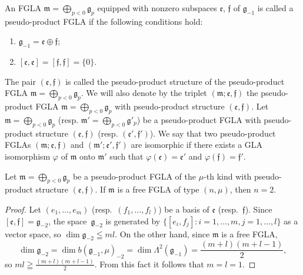 \documentclass[pdftex]{sigma}
\numberwithin{equation}{section}
\numberwithin{theorem}{section}
\numberwithin{proposition}{section}
\numberwithin{lemma}{section}
\numberwithin{corollary}{section}
\numberwithin{definition}{section}
\numberwithin{example}{section}
\numberwithin{remark}{section}
\numberwithin{note}{section}
\begin{document}
An FGLA $\mathfrak m=\bigoplus\limits_{p<0}\mathfrak g_p$ equipped with
nonzero subspaces $\mathfrak e$, $\mathfrak f$ of $\mathfrak g_{-1}$ is called
a pseudo-product FGLA if the following conditions hold:
\begin{enumerate}\itemsep=0pt
\renewcommand{\labelenumi}{$(\roman{enumi})$}
\item $\mathfrak g_{-1}=\mathfrak e\oplus\mathfrak f$;
\item $[\mathfrak e,\mathfrak e]=[\mathfrak f,\mathfrak f]=\{0\}$.
\end{enumerate}
The pair $(\mathfrak e,\mathfrak f)$ is called the pseudo-product structure of
the pseudo-product FGLA
$\mathfrak m=\bigoplus\limits_{p<0}\mathfrak g_p$.
We will also denote by the triplet $(\mathfrak m;\mathfrak e,\mathfrak f)$
the pseudo-product FGLA $\mathfrak m=\bigoplus\limits_{p<0}\mathfrak g_p$
with pseudo-product structure $(\mathfrak e,\mathfrak f)$.
Let $\mathfrak m=\bigoplus\limits_{p<0}\mathfrak g_p$ (resp.
$\mathfrak m'=\bigoplus\limits_{p<0}\mathfrak g'_p$) be a
pseudo-product FGLA with pseudo-product structure $(\mathfrak e,\mathfrak f)$
(resp. $(\mathfrak e',\mathfrak f')$).
We say that two pseudo-product FGLAs $(\mathfrak m;\mathfrak e,\mathfrak f)$
and $(\mathfrak m';\mathfrak e',\mathfrak f')$
are isomorphic if there exists a GLA isomorphism
$\varphi$ of $\mathfrak m$ onto $\mathfrak m'$ such that
$\varphi(\mathfrak e)=\mathfrak e'$ and $\varphi(\mathfrak f)=\mathfrak f'$.
\begin{proposition}\label{prop8.1} Let $\mathfrak m=\bigoplus\limits_{p<0}\mathfrak g_p$ be a
pseudo-product FGLA of the $\mu$-th kind with pseudo-product
structure $(\mathfrak e,\mathfrak f)$.
If $\mathfrak m$ is a free FGLA of type $(n,\mu)$,
then $n=2$.
\end{proposition}

\begin{proof} Let $(e_1,\dots,e_m)$ (resp.\ $(f_1,\dots,f_l)$) be a basis of
$\mathfrak e$ (resp.~$\mathfrak f$).
Since $[\mathfrak e,\mathfrak f]=\mathfrak g_{-2}$,
the space~$\mathfrak g_{-2}$ is generated by
$\{[e_i,f_j]:i=1,\dots,m,j=1,\dots,l\}$ as a vector space, so
$\dim \mathfrak g_{-2}\leqq ml$. On the other hand,
since $\mathfrak m$ is a free FGLA,
\[
\dim \mathfrak g_{-2}=\dim b(\mathfrak g_{-1},\mu)_{-2}=
\dim \Lambda^2(\mathfrak g_{-1})=\frac{(m+l)(m+l-1)}{2},
\]
so $ml\geqq \frac{(m+l)(m+l-1)}{2}$.
From this fact it follows that $m=l=1$.
\end{proof}
\end{document}

